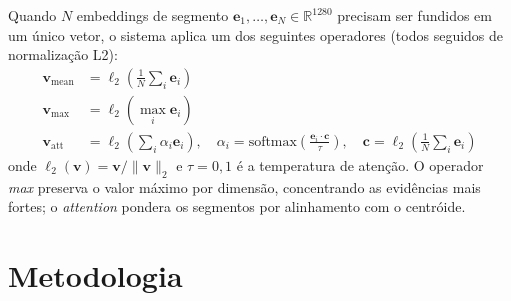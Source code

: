 \documentclass[12pt]{article}
\begin{document}
Quando $N$ embeddings de segmento $\mathbf{e}_1,\ldots,\mathbf{e}_N \in
\mathbb{R}^{1280}$ precisam ser fundidos em um único vetor, o sistema aplica
um dos seguintes operadores (todos seguidos de normalização L2):
\begin{align}
  \mathbf{v}_{\text{mean}}   &= \ell_2\!\left(\tfrac{1}{N}\textstyle\sum_i \mathbf{e}_i\right)
  \label{eq:mean}\\
  \mathbf{v}_{\text{max}}    &= \ell_2\!\left(\max_i \mathbf{e}_i\right)
  \label{eq:max}\\
  \mathbf{v}_{\text{att}} &= \ell_2\!\left(\sum_i \alpha_i \mathbf{e}_i\right),
  \quad
  \alpha_i = \text{softmax}\!\left(\frac{\mathbf{e}_i \cdot \mathbf{c}}{\tau}\right),
  \quad \mathbf{c} = \ell_2\!\left(\tfrac{1}{N}\textstyle\sum_i\mathbf{e}_i\right)
  \label{eq:att}
\end{align}
onde $\ell_2(\mathbf{v}) = \mathbf{v}/\|\mathbf{v}\|_2$ e $\tau = 0{,}1$ é
a temperatura de atenção. O operador \textit{max} preserva o valor máximo por
dimensão, concentrando as evidências mais fortes; o \textit{attention} pondera
os segmentos por alinhamento com o centróide.

\section{Metodologia}
\label{sec:metod}



\end{document}
